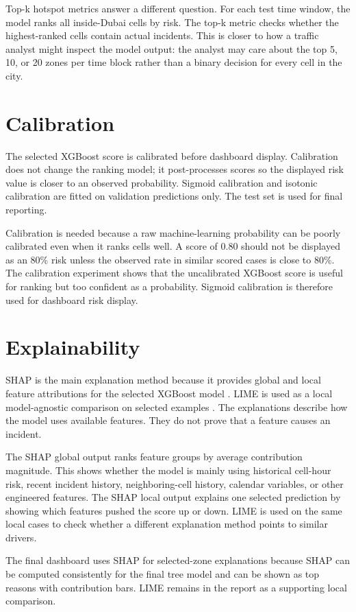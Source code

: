 Top-k hotspot metrics answer a different question. For each test time window, the model ranks all inside-Dubai cells by risk. The top-k metric checks whether the highest-ranked cells contain actual incidents. This is closer to how a traffic analyst might inspect the model output: the analyst may care about the top 5, 10, or 20 zones per time block rather than a binary decision for every cell in the city.

\section{Calibration}

The selected XGBoost score is calibrated before dashboard display. Calibration does not change the ranking model; it post-processes scores so the displayed risk value is closer to an observed probability. Sigmoid calibration and isotonic calibration are fitted on validation predictions only. The test set is used for final reporting.

Calibration is needed because a raw machine-learning probability can be poorly calibrated even when it ranks cells well. A score of 0.80 should not be displayed as an 80\% risk unless the observed rate in similar scored cases is close to 80\%. The calibration experiment shows that the uncalibrated XGBoost score is useful for ranking but too confident as a probability. Sigmoid calibration is therefore used for dashboard risk display.

\section{Explainability}

SHAP is the main explanation method because it provides global and local feature attributions for the selected XGBoost model \cite{lundberg2017shap}. LIME is used as a local model-agnostic comparison on selected examples \cite{ribeiro2016lime}. The explanations describe how the model uses available features. They do not prove that a feature causes an incident.

The SHAP global output ranks feature groups by average contribution magnitude. This shows whether the model is mainly using historical cell-hour risk, recent incident history, neighboring-cell history, calendar variables, or other engineered features. The SHAP local output explains one selected prediction by showing which features pushed the score up or down. LIME is used on the same local cases to check whether a different explanation method points to similar drivers.

The final dashboard uses SHAP for selected-zone explanations because SHAP can be computed consistently for the final tree model and can be shown as top reasons with contribution bars. LIME remains in the report as a supporting local comparison.
